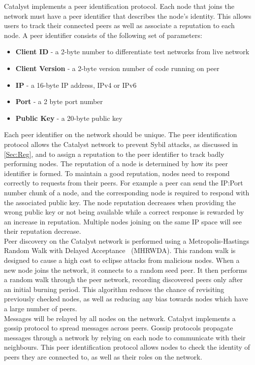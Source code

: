 Catalyst implements a peer identification protocol. Each node that joins the network must have a peer identifier that describes the node’s identity. This allows users to track their connected peers as well as associate a reputation to each node. A peer identifier consists of the following set of parameters:

\begin{itemize}
\item \textbf{Client ID} - a 2-byte number to differentiate test networks from live network
\item \textbf{Client Version} - a 2-byte version number of code running on peer 
\item \textbf{IP} -  a 16-byte IP address, IPv4 or IPv6
\item \textbf{Port} - a 2 byte port number 
\item \textbf{Public Key} - a 20-byte public key
\end{itemize}  

Each peer identifier on the network should be unique. The peer identification protocol allows the Catalyst network to prevent Sybil attacks, as discussed in \ref{Sec:Reg}, and to assign a reputation to the peer identifier to track badly performing nodes. The reputation of a node is determined by how its peer identifier is formed. To maintain a good reputation, nodes need to respond correctly to requests from their peers. For example a peer can send the IP:Port number chunk of a node, and the corresponding node is required to respond with the associated public key. The node reputation decreases when providing the wrong public key or not being available while a correct response is rewarded by an increase in reputation. Multiple nodes joining on the same IP space will see their reputation decrease. \\

Peer discovery on the Catalyst network is performed using a Metropolis-Hastings Random Walk with Delayed Acceptance~\cite{hasting} (MHRWDA). This random walk is designed to cause a high cost to eclipse attacks from malicious nodes. When a new node joins the network, it connects to a random seed peer. It then performs a random walk through the peer network, recording discovered peers only after an initial burning period. This algorithm reduces the chance of revisiting previously checked nodes, as well as reducing any bias towards nodes which have a large number of peers. \\

Messages will be relayed by all nodes on the network. Catalyst implements a gossip protocol to spread messages across peers. Gossip protocols propagate messages through a network by relying on each node to communicate with their neighbours. This peer identification protocol allows nodes to check the identity of peers they are connected to, as well as their roles on the network. 